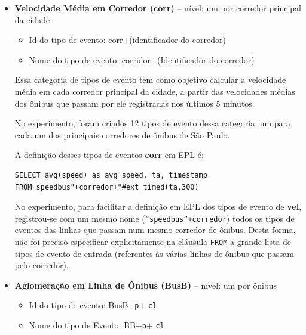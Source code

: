 \begin{itemize}

\item \textbf{Velocidade Média em Corredor (corr)} -- nível: um por corredor principal da cidade

\begin{itemize}
    \item Id do tipo de evento: corr+(identificador do corredor)
    \item Nome do tipo de evento: corridor+(Identificador do corredor)
\end{itemize}


Essa categoria de tipos de evento tem como objetivo calcular a velocidade média em cada corredor principal da cidade, a partir das velocidades médias dos ônibus que passam por ele registradas nos últimos 5 minutos. 

No experimento, foram criados 12 tipos de evento dessa categoria, um para cada um dos principais corredores de ônibus de São Paulo.

A definição desses tipos de eventos \textbf{corr} em EPL é:
\begin{verbatim}
SELECT avg(speed) as avg_speed, ta, timestamp 
FROM speedbus"+corredor+"#ext_timed(ta,300)
\end{verbatim}

No experimento, para facilitar a definição em EPL dos tipos de evento de \textbf{vel}, registrou-se com um mesmo nome (\texttt{``speedbus''+corredor}) todos os tipos de eventos das linhas que passam num mesmo corredor de ônibus. Desta forma, não foi preciso especificar explicitamente na cláusula \texttt{FROM} a grande lista de tipos de evento de entrada (referentes às várias linhas de ônibus que passam pelo corredor).

\item \textbf{Aglomeração em Linha de Ônibus (BusB)} -- nível: um por ônibus

\begin{itemize}
    \item Id do tipo de evento: BusB+\texttt{p}+ \texttt{cl}
    \item Nome do tipo de Evento: BB+\texttt{p}+ \texttt{cl}
\end{itemize}


\end{itemize}
